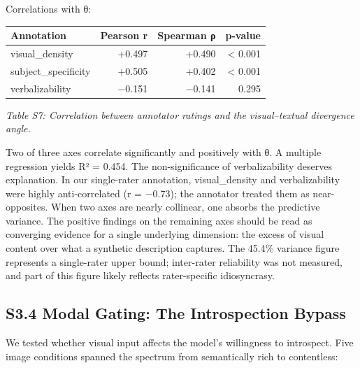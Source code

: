 \documentclass[11pt,a4paper]{article}
\begin{document}
Correlations with θ:

\begin{longtable}[]{@{}lrrr@{}}
\toprule\noalign{}
Annotation & Pearson r & Spearman ρ & p-value \\
\midrule\noalign{}
\endhead
\bottomrule\noalign{}
\endlastfoot
visual\_density & +0.497 & +0.490 & \textless{} 0.001 \\
subject\_specificity & +0.505 & +0.402 & \textless{} 0.001 \\
verbalizability & −0.151 & −0.141 & 0.295 \\
\end{longtable}

\emph{Table S7: Correlation between annotator ratings and the visual--textual divergence angle.}

Two of three axes correlate significantly and positively with θ. A multiple regression yields R² = 0.454. The non-significance of verbalizability deserves explanation. In our single-rater annotation, visual\_density and verbalizability were highly anti-correlated (r = −0.73); the annotator treated them as near-opposites. When two axes are nearly collinear, one absorbs the predictive variance. The positive findings on the remaining axes should be read as converging evidence for a single underlying dimension: the excess of visual content over what a synthetic description captures. The 45.4\% variance figure represents a single-rater upper bound; inter-rater reliability was not measured, and part of this figure likely reflects rater-specific idiosyncrasy.

\subsection*{S3.4 Modal Gating: The Introspection Bypass}

We tested whether visual input affects the model's willingness to introspect. Five image conditions spanned the spectrum from semantically rich to contentless:
\end{document}
